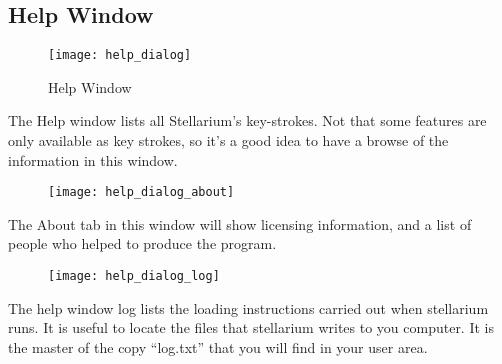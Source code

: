 \subsection{Help Window}\label{help-window}

\begin{figure}[h]
\centering\texttt{[image: help\_dialog]}
\caption{Help Window}
\end{figure}

The Help window lists all Stellarium's key-strokes. Not that some
features are only available as key strokes, so it's a good idea to have
a browse of the information in this window.

\begin{figure}[h]
\centering\texttt{[image: help\_dialog\_about]}
\end{figure}

The About tab in this window will show licensing information, and a list
of people who helped to produce the program.

\begin{figure}[h]
\centering\texttt{[image: help\_dialog\_log]}
\end{figure}

The help window log lists the loading instructions carried out when
stellarium runs. It is useful to locate the files that stellarium writes
to you computer. It is the master of the copy ``log.txt'' that you will
find in your user area.
